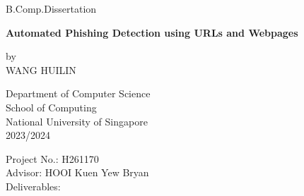 \begin{titlepage}
    \begin{center}
            
        \large
        B.Comp.Dissertation\\
            
        
        \Large
        
        \vspace{3cm}
        
        \Large
        \textbf{Automated Phishing Detection using URLs and Webpages}
        
        \vspace{1.5cm}
        
        \Large
        \Large
        
        \large
        by\\
        \vspace{0.5cm}
        \large
        WANG HUILIN
            
        \vspace{3cm}
            
        \large
        Department of Computer Science \\
        School of Computing \\
        National University of Singapore \\
        
        \vspace{1cm}
        \normalsize
        2023/2024
    \end{center}

    \vspace{4cm}
    \begin{flushleft}
    Project No.: H261170\\
    Advisor: HOOI Kuen Yew Bryan\\
    Deliverables: \\
    \end{flushleft}
\end{titlepage}